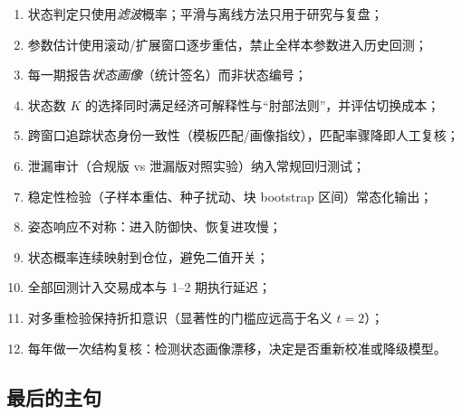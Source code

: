 \begin{enumerate}[itemsep=2.5pt]
\item 状态判定只使用\emph{滤波}概率；平滑与离线方法只用于研究与复盘；
\item 参数估计使用滚动/扩展窗口逐步重估，禁止全样本参数进入历史回测；
\item 每一期报告\emph{状态画像}（统计签名）而非状态编号；
\item 状态数 $K$ 的选择同时满足经济可解释性与“肘部法则”，并评估切换成本；
\item 跨窗口追踪状态身份一致性（模板匹配/画像指纹），匹配率骤降即人工复核；
\item 泄漏审计（合规版 vs 泄漏版对照实验）纳入常规回归测试；
\item 稳定性检验（子样本重估、种子扰动、块 bootstrap 区间）常态化输出；
\item 姿态响应不对称：进入防御快、恢复进攻慢；
\item 状态概率连续映射到仓位，避免二值开关；
\item 全部回测计入交易成本与 1--2 期执行延迟；
\item 对多重检验保持折扣意识（显著性的门槛应远高于名义 $t=2$）；
\item 每年做一次结构复核：检测状态画像漂移，决定是否重新校准或降级模型。
\end{enumerate}

\subsection{最后的主句}

